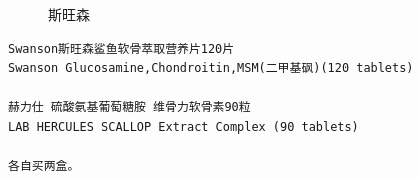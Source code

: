\begin{figure}[htbp]
\begin{minipage}{.5\linewidth}
\caption{斯旺森}\label{fig-hive-2}
\end{minipage}
\end{figure} 
\begin{verbatim}
Swanson斯旺森鲨鱼软骨萃取营养片120片
Swanson Glucosamine,Chondroitin,MSM(二甲基砜)(120 tablets)

赫力仕 硫酸氨基葡萄糖胺 维骨力软骨素90粒
LAB HERCULES SCALLOP Extract Complex (90 tablets)

各自买两盒。
\end{verbatim}
